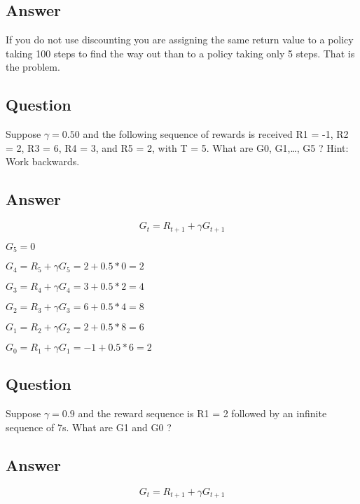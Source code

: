 \documentclass[11pt]{article}
\begin{document}
    \subsection*{Answer}

    If you do not use discounting you are assigning the same return value to a policy taking 100 steps to find the way out than to a policy taking only 5 steps. That is the problem.

    \subsection{Question}

    Suppose $\gamma=0.5$0 and the following sequence of rewards is received R1 = -1, R2 = 2, R3 = 6, R4 = 3, and R5 = 2, with T = 5.
    What are G0, G1,\ldots, G5 ?
    Hint: Work backwards.

    \subsection*{Answer}

    \begin{equation}
        G_t = R_{t+1} + \gamma G_{t+1}
    \end{equation}

    $G_5 = 0$

    $G_4 = R_{5} + \gamma G_{5} = 2 + 0.5 * 0 = 2 $

    $G_3 = R_{4} + \gamma G_{4} = 3 + 0.5 * 2 = 4 $

    $G_2 = R_{3} + \gamma G_{3} = 6 + 0.5 * 4 = 8 $

    $G_1 = R_{2} + \gamma G_{2} = 2 + 0.5 * 8 = 6 $

    $G_0 = R_{1} + \gamma G_{1} = -1 + 0.5 * 6 = 2 $

    \subsection{Question}

    Suppose $\gamma= 0.9$ and the reward sequence is R1 = 2 followed by an infinite sequence of 7s.
    What are G1 and G0 ?

    \subsection*{Answer}

    \begin{equation}
        G_t = R_{t+1} + \gamma G_{t+1}
    \end{equation}
\end{document}

